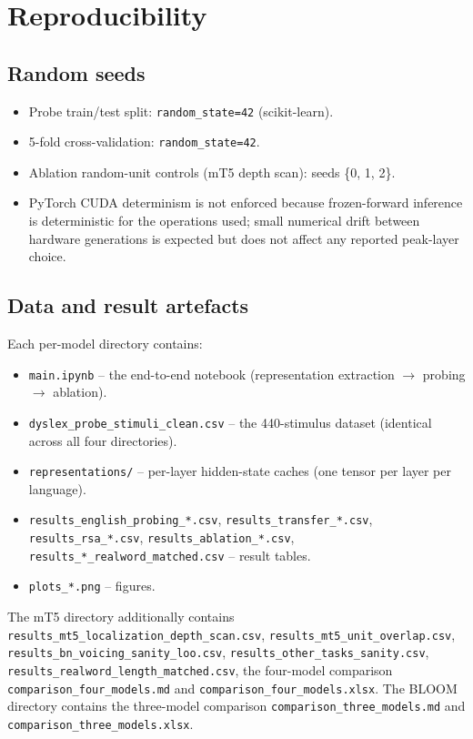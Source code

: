 \section*{Reproducibility}

\subsection*{Random seeds}

\begin{itemize}
    \item Probe train/test split: \texttt{random\_state=42} (scikit-learn).
    \item 5-fold cross-validation: \texttt{random\_state=42}.
    \item Ablation random-unit controls (mT5 depth scan): seeds \{0, 1, 2\}.
    \item PyTorch CUDA determinism is not enforced because frozen-forward inference is deterministic for the operations used; small numerical drift between hardware generations is expected but does not affect any reported peak-layer choice.
\end{itemize}

\subsection*{Data and result artefacts}

Each per-model directory contains:
\begin{itemize}
    \item \texttt{main.ipynb} -- the end-to-end notebook (representation extraction $\rightarrow$ probing $\rightarrow$ ablation).
    \item \texttt{dyslex\_probe\_stimuli\_clean.csv} -- the 440-stimulus dataset (identical across all four directories).
    \item \texttt{representations/} -- per-layer hidden-state caches (one tensor per layer per language).
    \item \texttt{results\_english\_probing\_*.csv}, \texttt{results\_transfer\_*.csv}, \texttt{results\_rsa\_*.csv}, \texttt{results\_ablation\_*.csv}, \texttt{results\_*\_realword\_matched.csv} -- result tables.
    \item \texttt{plots\_*.png} -- figures.
\end{itemize}

The mT5 directory additionally contains \texttt{results\_mt5\_localization\_depth\_scan.csv}, \texttt{results\_mt5\_unit\_overlap.csv}, \texttt{results\_bn\_voicing\_sanity\_loo.csv}, \texttt{results\_other\_tasks\_sanity.csv}, \texttt{results\_realword\_length\_matched.csv}, the four-model comparison \texttt{comparison\_four\_models.md} and \texttt{comparison\_four\_models.xlsx}. The BLOOM directory contains the three-model comparison \texttt{comparison\_three\_models.md} and \texttt{comparison\_three\_models.xlsx}.

